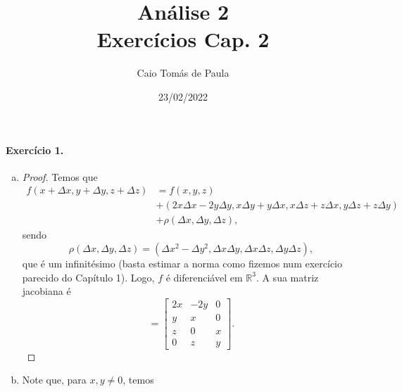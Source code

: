 \documentclass[12pt,a4paper]{article}
\title{\textbf{Análise 2}\\ Exercícios Cap. 2}
\author{Caio Tomás de Paula}
\date{23/02/2022}
\newcommand{\R}{\mathbb{R}}
\begin{document}
\maketitle

\paragraph{Exercício 1.}
%
    \begin{enumerate}[a)]
        \item
        \begin{proof}
            Temos que
            \begin{align*}
                f(x+\Delta x, y+\Delta y, z+\Delta z) &= f(x,y,z) \\
                                                      &+(2x\Delta x - 2y\Delta y, x\Delta y + y\Delta x,
                                                        x\Delta z + z\Delta x, y\Delta z + z\Delta y) \\
                                                      &+ \rho(\Delta x, \Delta y, \Delta z),
            \end{align*}
            sendo 
            \begin{equation*}
                \rho(\Delta x, \Delta y, \Delta z) = (\Delta x^2 - \Delta y^2, \Delta x\Delta y, 
                                                    \Delta x\Delta z, \Delta y\Delta z),
            \end{equation*}
            que é um infinitésimo (basta estimar a norma como fizemos num exercício parecido do Capítulo 1).
            Logo, $f$ é diferenciável em $\R^3$. A sua matriz jacobiana é
            \begin{equation*}
                [Df(x,y,z)] = 
                \begin{bmatrix}
                    2x & -2y & 0 \\
                    y & x & 0 \\
                    z & 0 & x \\
                    0 & z & y
                \end{bmatrix}.
            \end{equation*}
        \end{proof}
        \item Note que, para $x, y\neq 0$, temos
        \begin{align*}

\end{align*}
\end{enumerate}
\end{document}

